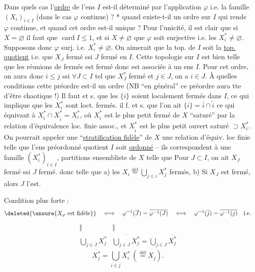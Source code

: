 Dans quels cas l'\uline{ordre} de l'ens $I$ est-il déterminé
par l'application $\varphi$ i.e. la famille $(X_i)_{i\in I}$ (dans le
cas $\varphi$ continue) ? * 
quand  existe-t-il un ordre sur $I$ qui rende $\varphi$
continue, et quand cet ordre est-il unique ?
Pour l'unicité, il est clair que si $X=\varnothing$ il
faut que $\operatorname{card}I\leq1$, et si $X\ne\varnothing$ que $\varphi$ soit
surjective i.e. les $X_i^*\ne\varnothing$. Supposons donc $\varphi$ surj. i.e.
$X_i^*\ne\varnothing$. On aimerait que la top. de $I$ soit la \uline{top.}
\uline{quotient} i.e. que $X_J$ fermé ssi $J$ fermé en $I$.
Cette topologie sur $I$ est bien telle que les réunions
de fermés est fermé  donc est associée à un ens
 $I$. Pour cet ordre, on aura donc
$i\leq j$ ssi  $\forall J\subset I$ tel que $X_J^*$ fermé et $j\in J$, on
a $i\in J$. À quelles conditions cette préordre est-il
un ordre (NB ``en général'' ce préordre aura tte
 d'être chaotique !) Il faut et s. que
les $\{i\}$ soient localement fermés dans $I$, ce
qui implique que les $X_i^*$ sont loct. fermés. 
 il f. et s. que  l'on ait 
$\{i\}=\overline i\cap\widetilde i$ ce qui équivaut à 
$X_{\overline i}^*\cap X_{\widetilde i}^*=X_i^*$,
où $X_{\overline i}^*$ est le plus petit fermé de $X$  ``saturé'' par la
relation d'équivalence loc. finie assoc., et $X_{\widetilde i}^*$ est le
plus petit ouvert saturé $\supset X_i^*$. On pourrait appeler
une ``\uline{stratification fidèle}'' de $X$ une relation d'équiv.
loc finie telle que l'ens préordonné quotient
$I$ soit \uline{ordonné} -- ils correspondent à une famille
$(X_i^*)_{i\in I}$, partitions ensembliste de $X$ 
 
 telle que
Pour $J\subset I$, on ait $X_J$ fermé ssi $J$ fermé.
donc telle que a) les $X_i\overset{\mathrm{déf}}=\bigcup_{j\leq i}X_j^*$ fermés,
b) Si $X_J$ est fermé, alors $J$ l'est.


Condition plus forte : 
\[
\deleted{\unsure{X_\varphi\text{ est fidèle}}}\quad\Longleftrightarrow\quad
\varphi^{-1}(\overline J)=\overline{\varphi^{-1}(J)}
\quad\Longleftrightarrow\quad
\varphi^{-1}(\overline j)=\overline{\varphi^{-1}(j)}\quad\text{i.e.}
\]
\[
\begin{array}{cc}
\Vert&\Vert\\
\displaystyle\bigcup_{j\in\overline J}X_j^*&
\displaystyle\overline{\bigcup_{j\in J}X_j^*}=\bigcup_{j\in J}\overline{X_j^*}
\end{array}
\]
\[
\overline{X_j^*}=\bigcup_{i\in\overline j}X_i^*\ (\overset{\mathrm{déf}}=X_j).
\]

